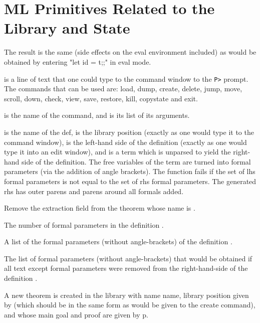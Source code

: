 \section{ML Primitives Related to the Library and State}

The result is
the same (side effects on the eval environment included) as would be
obtained by entering "let id = t;;" in eval mode.

   is a line of text that one
could type to the command window to the {\tt P>} prompt.  The commands that
can be used are:  load, dump, create, delete, jump, move, scroll, down,
check, view, save, restore, kill, copystate and exit.

   is the
name of the command, and  is its list of its arguments.

   is
the name of the def,  is the library position (exactly as one
would type it to the command window),  is the left-hand side of
the definition (exactly as one would type it into an edit window), and
 is a term which is unparsed to yield the right-hand side of
the definition.  The free variables of the term are turned into formal
parameters (via the addition of angle brackets).  The function fails if
the set of lhs formal parameters is not equal to the set of rhs formal
parameters.  The generated rhs has outer parens and parens around all
formals added.

  Remove the extraction field from the
theorem whose name is .

  The number of formal parameters in
the definition .

  A list of the formal
parameters (without angle-brackets) of the definition .

  The list of
formal parameters (without angle-brackets) that would be obtained if all
text except formal parameters were removed from the right-hand-side of
the definition .

  A new
theorem is created in the library with name name, library position given
by  (which should be in the same form as would be given to
the create command), and whose main goal and proof are given by p.

